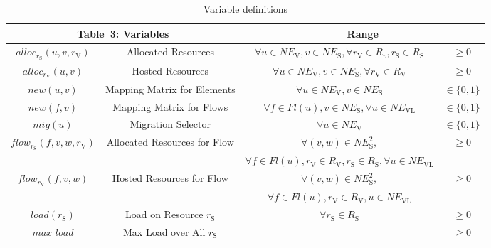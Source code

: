 \documentclass[conference,10pt]{IEEEtran}
\newcommand{\mrm}{\mathrm}
\begin{document}
\begin{table*} [th]
\begin{center}
\begin{scriptsize}
\begin{tabular}{ | c | c | c | c |}
\hline
\multicolumn{2}{|c|}{Table~3: Variables} & \multicolumn{2}{|c|}{Range}\\
\hline
  $alloc_{r_\mrm{S}}(u,v,r_\mrm{V})$ & Allocated Resources & $\forall u \in NE_\mrm{V}, v \in NE_\mrm{S}, \forall r_\mrm{V} \in R_v ,r_\mrm{S} \in R_\mrm{S}$ & $\geq 0$\\
  $alloc_{r_\mrm{V}}(u,v)$ & Hosted Resources & $\forall u \in NE_\mrm{V}, v \in NE_\mrm{S}, \forall r_\mrm{V} \in R_\mrm{V}$ & $\geq 0$\\
  $new(u,v)$ & Mapping Matrix for Elements & $\forall u \in NE_\mrm{V}, v \in NE_\mrm{S}$ & $\in \{0,1\}$\\
  $new(f,v)$ & Mapping Matrix for Flows & $\forall f\in Fl(u), v \in NE_\mrm{S}, \forall u\in NE_{\mrm{VL}}$ & $\in \{0,1\}$\\
  $mig(u)$ & Migration Selector & $\forall u \in NE_\mrm{V}$ & $\in \{0,1\}$\\
  $flow_{r_\mrm{S}}(f,v,w,r_\mrm{V})$ & Allocated Resources for Flow & $\forall (v,w) \in NE_\mrm{S}^2, $ & $\geq 0$\\
	& & $\forall f \in Fl(u), r_\mrm{V}\in R_\mrm{V}, r_\mrm{S} \in R_\mrm{S}, \forall u \in NE_{\mrm{VL}}$ & \\
  $flow_{r_\mrm{V}}(f,v,w)$ & Hosted Resources for Flow & $\forall (v,w) \in NE_\mrm{S}^2, $ & $\geq 0$\\
	& & $\forall f \in Fl(u), r_\mrm{V} \in R_\mrm{V}, u \in NE_{\mrm{VL}}$ & \\
$load(r_\mrm{S})$ & Load on Resource $r_\mrm{S}$ & $\forall r_\mrm{S} \in R_\mrm{S}$ & $\geq 0$\\
  $max\_load$ & Max Load over All $r_\mrm{S}$ & & $\geq 0$\\
  \hline
\end{tabular}\label{vars}
\end{scriptsize}
\caption{Variable definitions}\label{tab:variables}
\end{center}
\end{table*}
\end{document}
